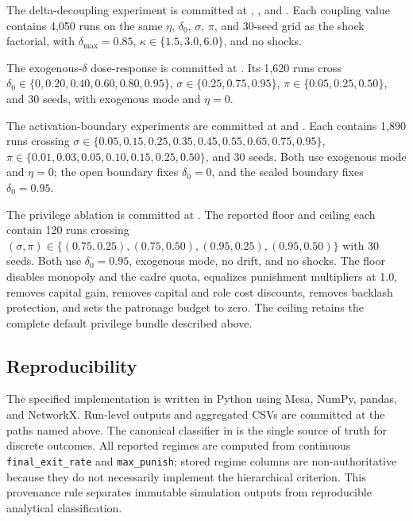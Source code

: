 \documentclass[12pt]{article}
\begin{document}
The delta-decoupling experiment is committed at , , and . Each coupling value contains 4,050 runs on the same \(\eta\), \(\delta_0\), \(\sigma\), \(\pi\), and 30-seed grid as the shock factorial, with \(\delta_{\max}=0.85\), \(\kappa\in\{1.5,3.0,6.0\}\), and no shocks.

The exogenous-\(\delta\) dose-response is committed at . Its 1,620 runs cross \(\delta_0\in\{0,\allowbreak 0.20,\allowbreak 0.40,\allowbreak 0.60,\allowbreak 0.80,\allowbreak 0.95\}\), \(\sigma\in\{0.25,0.75,0.95\}\), \(\pi\in\{0.05,0.25,0.50\}\), and 30 seeds, with exogenous mode and \(\eta=0\).

The activation-boundary experiments are committed at  and . Each contains 1,890 runs crossing \(\sigma\in\{0.05,\allowbreak 0.15,\allowbreak 0.25,\allowbreak 0.35,\allowbreak 0.45,\allowbreak 0.55,\allowbreak 0.65,\allowbreak 0.75,\allowbreak 0.95\}\), \(\pi\in\{0.01,\allowbreak 0.03,\allowbreak 0.05,\allowbreak 0.10,\allowbreak 0.15,\allowbreak 0.25,\allowbreak 0.50\}\), and 30 seeds. Both use exogenous mode and \(\eta=0\); the open boundary fixes \(\delta_0=0\), and the sealed boundary fixes \(\delta_0=0.95\).

The privilege ablation is committed at . The reported floor and ceiling each contain 120 runs crossing \((\sigma,\pi)\in\{(0.75,0.25),\allowbreak (0.75,0.50),\allowbreak (0.95,0.25),\allowbreak (0.95,0.50)\}\) with 30 seeds. Both use \(\delta_0=0.95\), exogenous mode, no drift, and no shocks. The floor disables monopoly and the cadre quota, equalizes punishment multipliers at 1.0, removes capital gain, removes capital and role cost discounts, removes backlash protection, and sets the patronage budget to zero. The ceiling retains the complete default privilege bundle described above.

\subsection{Reproducibility}

The specified implementation is written in Python using Mesa, NumPy, pandas, and NetworkX. Run-level outputs and aggregated CSVs are committed at the paths named above. The canonical classifier in  is the single source of truth for discrete outcomes. All reported regimes are computed from continuous \texttt{final\_exit\_rate} and \texttt{max\_punish}; stored regime columns are non-authoritative because they do not necessarily implement the hierarchical criterion. This provenance rule separates immutable simulation outputs from reproducible analytical classification.
\end{document}
